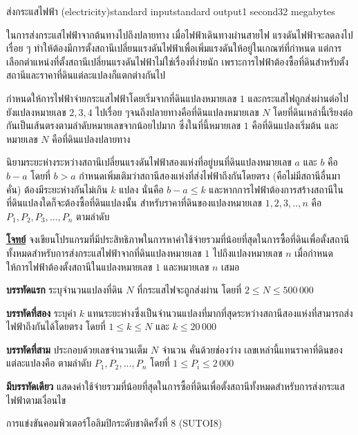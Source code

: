 \documentclass[11pt,a4paper]{article}
\begin{document}
\begin{problem}{ส่งกระแสไฟฟ้า (electricity)}{standard input}{standard output}{1 second}{32 megabytes}

ในการส่งกระแสไฟฟ้าจากต้นทางไปถึงปลายทาง เมื่อไฟฟ้าเดินทางผ่านสายไฟ แรงดันไฟฟ้าจะลดลงไปเรื่อย ๆ ทำให้ต้องมีการตั้งสถานีเปลี่ยนแรงดันไฟฟ้าเพื่อเพิ่มแรงดันให้อยู่ในเกณฑ์ที่กำหนด แต่การเลือกตำแหน่งที่ตั้งสถานีเปลี่ยนแรงดันไฟฟ้าไม่ใช่เรื่องที่ง่ายนัก เพราะการไฟฟ้าต้องซื้อที่ดินสำหรับตั้งสถานีและราคาที่ดินแต่ละแปลงก็แตกต่างกันไป

กำหนดให้การไฟฟ้าจ่ายกระแสไฟฟ้าโดยเริ่มจากที่ดินแปลงหมายเลข $1$ และกระแสไฟถูกส่งผ่านต่อไปยังแปลงหมายเลข $2, 3, 4$ ไปเรื่อย ๆจนถึงปลายทางคือที่ดินแปลงหมายเลข $N$ โดยที่ดินเหล่านี้เรียงต่อกันเป็นเส้นตรงตามลำดับหมายเลขจากน้อยไปมาก ซึ่งในที่นี้หมายเลข $1$ คือที่ดินแปลงเริ่มต้น และหมายเลข $N$ คือที่ดินแปลงปลายทาง

นิยามระยะห่างระหว่างสถานีเปลี่ยนแรงดันไฟฟ้าสองแห่งที่อยู่บนที่ดินแปลงหมายเลข $a$ และ $b$ คือ $b-a$ โดยที่ $b > a$ กำหนดเพิ่มเติมว่าสถานีสองแห่งที่ส่งไฟฟ้าถึงกันโดยตรง (คือไม่มีสถานีอื่นมาคั่น) ต้องมีระยะห่างกันไม่เกิน $k$ แปลง นั่นคือ $b-a \leq k$ และหากการไฟฟ้าต้องการสร้างสถานีในที่ดินแปลงใดก็จะต้องซื้อที่ดินแปลงนั้น สำหรับราคาที่ดินของแปลงหมายเลข $1,2,3,..,n$ คือ $P_1,P_2,P_3,...,P_n$ ตามลำดับ

          

\bigskip
\underline{\textbf{โจทย์}}  จงเขียนโปรแกรมที่มีประสิทธิภาพในการหาค่าใช้จ่ายรวมที่น้อยที่สุดในการซื้อที่ดินเพื่อตั้งสถานีทั้งหมดสำหรับการส่งกระแสไฟฟ้าจากที่ดินแปลงหมายเลข $1$ ไปถึงแปลงหมายเลข $n$ เมื่อกำหนดให้การไฟฟ้าต้องตั้งสถานีในแปลงหมายเลข $1$ และหมายเลข $n$ เสมอ


\InputFile

\textbf{บรรทัดแรก} ระบุจำนวนแปลงที่ดิน $N$ ที่กระแสไฟจะถูกส่งผ่าน โดยที่ $2 \leq N \leq 500\,000$ 

\textbf{บรรทัดที่สอง} ระบุค่า $k$ แทนระยะห่างซึ่งเป็นจำนวนแปลงที่มากที่สุดระหว่างสถานีสองแห่งที่สามารถส่งไฟฟ้าถึงกันได้โดยตรง โดยที่ $1 \leq k \leq N$  และ $k \leq 20\,000$ 

\textbf{บรรทัดที่สาม} ประกอบด้วยเลขจำนวนเต็ม $N$ จำนวน คั่นด้วยช่องว่าง เลขเหล่านี้แทนราคาที่ดินของแต่ละแปลงคือ  ตามลำดับ $P_1,P_2,...,P_n$ โดยที่ $1 \leq P_i \leq 2\,000$


\OutputFile

\textbf{มีบรรทัดเดียว} แสดงค่าใช้จ่ายรวมที่น้อยที่สุดในการซื้อที่ดินเพื่อตั้งสถานีทั้งหมดสำหรับการส่งกระแสไฟฟ้าตามเงื่อนไข

\Examples

\begin{example}
%
%
\end{example}


\Source

การแข่งขันคอมพิวเตอร์โอลิมปิกระดับชาติครั้งที่ 8 (SUTOI8)

\end{problem}
\end{document}
